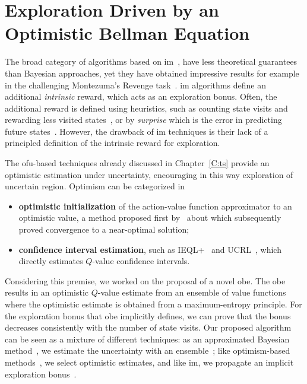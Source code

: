 \chapter{Exploration Driven by an Optimistic Bellman Equation}\label{C:opt}
The broad category of algorithms based on \gls{im}~\cite{singh2004intrinsically}, have less theoretical guarantees
than Bayesian approaches, yet they have obtained impressive results
for example in the challenging Montezuma's Revenge task~\cite{bellemare2016unifying}. \gls{im}
algorithms define an additional \textit{intrinsic} reward, which acts as an exploration bonus. Often, the additional
reward is defined using heuristics, such as counting state visits and
rewarding less visited states~\cite{ostrovski2017count}, or by
\textit{surprise} which is the error in predicting future
states~\cite{pathak2017curiosity}. However, the drawback of \gls{im} techniques is
their lack of a principled definition of the intrinsic reward for exploration.

The \gls{ofu}-based techniques already discussed in Chapter~\ref{C:ts} provide an optimistic estimation under uncertainty, encouraging in this way exploration of uncertain region. Optimism can be categorized in
\begin{itemize}
 \item \textbf{optimistic initialization} of the action-value function approximator to an optimistic value, a method proposed first by~\cite{sutton1998reinforcement} about which subsequently~\cite{even2002convergence} proved convergence to a near-optimal solution;
 \item \textbf{confidence interval estimation}, such as IEQL+~\cite{meuleau1999exploration} and UCRL~\cite{auer2007logarithmic}, which directly estimates $Q$-value confidence intervals.
\end{itemize}

Considering this premise, we worked on the proposal of a novel \gls{obe}. The \gls{obe} results in an optimistic $Q$-value estimate
from an ensemble of value functions where the optimistic estimate is obtained from a maximum-entropy principle. For the exploration bonus that \gls{obe} implicitly defines, we can prove that the bonus decreases consistently with the number of
state visits. Our proposed algorithm can be seen as a mixture of
different techniques: as an approximated Bayesian method~\cite{engel2005reinforcement,vlassis2012bayesian}, we estimate
the uncertainty with an ensemble~\cite{osband2017deep}; like optimism-based methods~\cite{lai1985asymptotically,kearns2002near,brafman2002r,azizzadenesheli2517efficient}, we select
optimistic estimates, and like \gls{im}, we propagate an implicit
exploration bonus~\cite{singh2004intrinsically,schmidhuber2008driven,white2010interval}.

